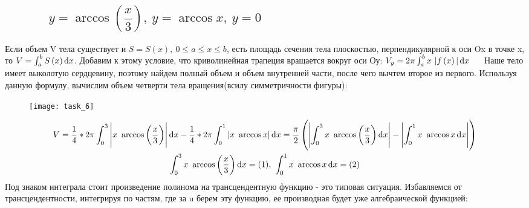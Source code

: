 \documentclass{article}
\begin{document}
			\subsection*{\ \ \ \ \ \ $y = \arccos\left(\dfrac x 3\right), \ y = \arccos x, \ y = 0$}
				Если объем V тела существует и $S = S\left(x\right), \ 0 \le a \le x \le b$, есть площадь сечения тела плоскостью, перпендикулярной к оси Ox в точке x, то $V = \int_a^b S\left(x\right) \dif x$. Добавим к этому условие, что криволинейная трапеция вращается вокруг оси Оу: $V_y = 2\pi \int_a^b x \ |f\left(x\right)| \dif x \ \ \ \ $ Наше тело имеет выколотую сердцевину, поэтому найдем полный объем и объем внутренней части, после чего вычтем второе из первого. Используя данную формулу, вычислим объем четверти тела вращения(всилу симметричности фигуры):
				\begin{figure}
					\centering
					\texttt{[image: task\_6]}
				\end{figure}
				\begin{multline*}
					V = \dfrac 1 4 * 2\pi \int_0^3 \left|x \ \arccos{\left(\dfrac x 3\right)}\right| \dif x - \dfrac 1 4 * 2\pi \int_0^1 \left|x \ \arccos x \right|\dif x = \dfrac{\pi}2 \left(\left|\int_0^3 x \ \arccos{\left(\dfrac x 3\right)} \dif x\right| - \left|\int_0^1 x \ \arccos x \dif x\right|\right)\\ \int_0^3 x \ \arccos{\left(\dfrac x 3\right)} \dif x = (1), \ \int_0^1 x \ \arccos x \dif x = (2)
				\end{multline*}
				Под знаком интеграла стоит произведение полинома на трансцендентную функцию - это типовая ситуация. Избавляемся от трансцендентности, интегрируя по частям, где за u берем эту функцию, ее производная будет уже алгебраической функцией:
\end{document}
